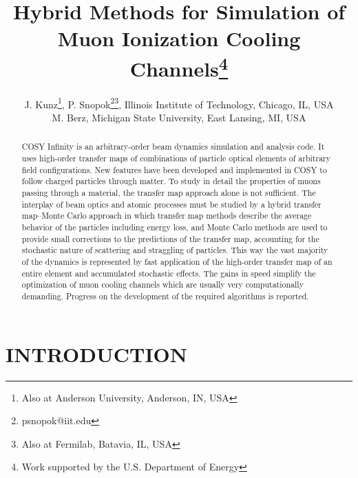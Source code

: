 \documentclass{jacow}
\begin{document}
\title{Hybrid Methods for Simulation of Muon Ionization Cooling Channels\thanks{Work supported by the U.S. Department of Energy}}

\author{J. Kunz\thanks{Also at Anderson University, Anderson, IN, USA}, P. Snopok\thanks{psnopok@iit.edu}\thanks{Also at Fermilab, Batavia, IL, USA}, Illinois Institute of Technology, Chicago, IL, USA\\
M. Berz, Michigan State University, East Lansing, MI, USA}

\maketitle

\begin{abstract}
COSY Infinity is an arbitrary-order beam dynamics simulation and analysis code. It uses high-order transfer maps of combinations of particle optical elements of arbitrary field configurations. New features have been developed and implemented in COSY to follow charged particles through matter. To study in detail the properties of muons passing through a material, the transfer map approach alone is not sufficient. The interplay of beam optics and atomic processes must be studied by a hybrid transfer map--Monte Carlo approach in which transfer map methods describe the average behavior of the particles including energy loss, and Monte Carlo methods are used to provide small corrections to the predictions of the transfer map, accounting for the stochastic nature of scattering and straggling of particles. This way the vast majority of the dynamics is represented by fast application of the high-order transfer map of an entire element and accumulated stochastic effects. The gains in speed simplify the optimization of muon cooling channels which are usually very computationally demanding. Progress on the development of the required algorithms is reported.
\end{abstract}

\section{INTRODUCTION}
\end{document}
